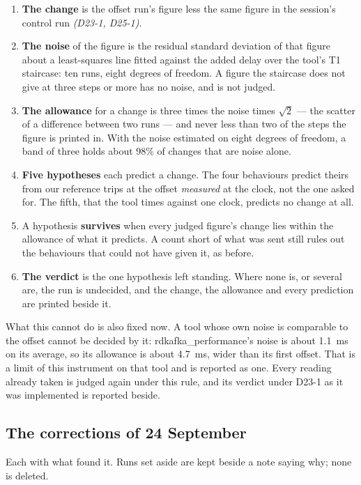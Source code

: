 \documentclass[11pt]{article}
\newcommand{\gl}[1]{{\color{soft}\itshape\small (#1)}}
\begin{document}
\begin{enumerate}
  \item \textbf{The change} is the offset run's figure less the same figure in the session's
        control run \gl{D23-1, D25-1}.
  \item \textbf{The noise} of the figure is the residual standard deviation of that figure about
        a least-squares line fitted against the added delay over the tool's T1 staircase: ten
        runs, eight degrees of freedom. A figure the staircase does not give at three steps or
        more has no noise, and is not judged.
  \item \textbf{The allowance} for a change is three times the noise times $\sqrt{2}$ --- the
        scatter of a difference between two runs --- and never less than two of the steps the
        figure is printed in. With the noise estimated on eight degrees of freedom, a band of
        three holds about 98\% of changes that are noise alone.
  \item \textbf{Five hypotheses} each predict a change. The four behaviours predict theirs from
        our reference trips at the offset \emph{measured} at the clock, not the one asked for.
        The fifth, that the tool times against one clock, predicts no change at all.
  \item A hypothesis \textbf{survives} when every judged figure's change lies within the
        allowance of what it predicts. A count short of what was sent still rules out the
        behaviours that could not have given it, as before.
  \item \textbf{The verdict} is the one hypothesis left standing. Where none is, or several are,
        the run is undecided, and the change, the allowance and every prediction are printed
        beside it.
\end{enumerate}

What this cannot do is also fixed now. A tool whose own noise is comparable to the offset cannot
be decided by it: rdkafka\_performance's noise is about 1.1~ms on its average, so its allowance
is about 4.7~ms, wider than its first offset. That is a limit of this instrument on that tool and
is reported as one. Every reading already taken is judged again under this rule, and its verdict
under D23-1 as it was implemented is reported beside.

\subsection*{The corrections of 24 September}
Each with what found it. Runs set aside are kept beside a note saying why; none is deleted.
\end{document}
